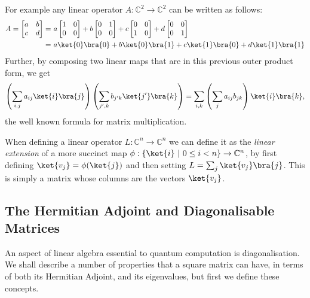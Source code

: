 For example any linear operator $A: \mathbb{C}^2 \to \mathbb{C}^2$ can be written as follows:
\begin{align*}
	A = \left[\begin{matrix}
		a&b\\
		c&d
	\end{matrix}\right]
	=&\ 
	a\left[\begin{matrix}
		1&0\\
		0&0
	\end{matrix}\right]
	+
	b\left[\begin{matrix}
		0&1\\
		0&0
	\end{matrix}\right]
	+
	c\left[\begin{matrix}
		0&0\\
		1&0
	\end{matrix}\right]
	+
	d\left[\begin{matrix}
		0&0\\
		0&1
	\end{matrix}\right]
	\\=&\  a\ket{0}\bra{0}+b\ket{0}\bra{1}+c\ket{1}\bra{0}+d\ket{1}\bra{1}
\end{align*}
Further, by composing two linear maps that are in this previous outer product form, we get
\[\left(\sum_{i,j}a_{ij}\ket{i}\bra{j}\right)\left(\sum_{j',k}b_{j'k}\ket{j'}\bra{k}\right) = \sum_{i,k}\left(\sum_j a_{ij}b_{jk}\right)\ket{i}\bra{k},\]
the well known formula for matrix multiplication.

When defining a linear operator $L: \mathbb{C}^n \to \mathbb{C}^n$ we can define it as the \emph{linear extension} of a more succinct map $\phi: \{\ket{i}\ |\ 0 \leq i < n\} \to \mathbb{C}^n$, by first defining $\ket{v_j} = \phi(\ket{j})$ and then setting $L = \sum_{j} \ket{v_j}\bra{j}$. This is simply a matrix whose columns are the vectors $\ket{v_j}$.
\subsection{The Hermitian Adjoint and Diagonalisable Matrices}\label{diagonalisable}
An aspect of linear algebra essential to quantum computation is diagonalisation. We shall describe a number of properties that a square matrix can have, in terms of both its Hermitian Adjoint, and its eigenvalues, but first we define these concepts.


